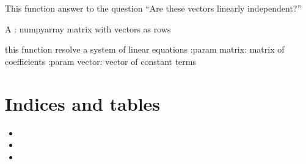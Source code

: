 \documentclass[letterpaper,10pt,english]{sphinxmanual}
\begin{document}

\begin{fulllineitems}
\label{\detokenize{index:main.linear_dependence}}
This function answer to the question “Are these vectors linearly independent?”

A : numpy\sphinxhyphen{}array matrix with vectors as rows

\end{fulllineitems}


\begin{fulllineitems}
\label{\detokenize{index:main.linear_equations}}
this function resolve a system of linear equations
:param matrix: matrix of coefficients
:param vector: vector of constant terms

\begin{sphinxVerbatim}[commandchars=\\\{\}]
\PYG{p}{[}\PYG{p}{]}
\end{sphinxVerbatim}

\end{fulllineitems}



\chapter{Indices and tables}
\label{\detokenize{index:indices-and-tables}}\begin{itemize}
\item {} 

\item {} 

\item {} 

\end{itemize}


\renewcommand{\indexname}{Python Module Index}
\begin{sphinxtheindex}
\let\bigletter\sphinxstyleindexlettergroup
\bigletter{m}
\item\relax{}
\end{sphinxtheindex}

\renewcommand{\indexname}{Index}
\printindex
\end{document}
